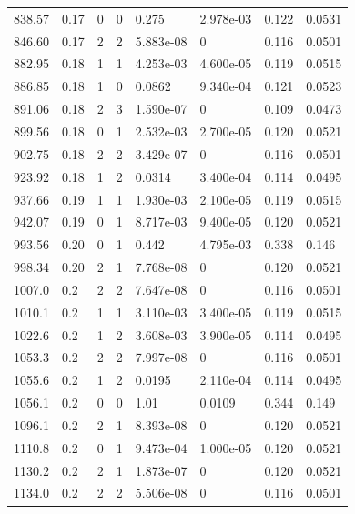 \documentclass[preview]{standalone}
\begin{document}
{{{\begin{tabular}{L{1.2cm}C{1.2cm} C{0.3cm}C{0.5cm} C{1.4cm}C{1.4cm} C{1.4cm}C{1.4cm}}
  838.57  &  0.17  & 0     &  0 &  0.275  & 2.978e-03  & 0.122 &  0.0531   \\ 
  846.60  &  0.17  & 2     &  2 &  5.883e-08  & 0  & 0.116 &  0.0501   \\ 
  882.95  &  0.18  & 1     &  1 &  4.253e-03  & 4.600e-05  & 0.119 &  0.0515   \\ 
  886.85  &  0.18  & 1     &  0 &  0.0862  & 9.340e-04  & 0.121 &  0.0523   \\ 
  891.06  &  0.18  & 2     &  3 &  1.590e-07  & 0  & 0.109 &  0.0473   \\ 
  899.56  &  0.18  & 0     &  1 &  2.532e-03  & 2.700e-05  & 0.120 &  0.0521   \\ 
  902.75  &  0.18  & 2     &  2 &  3.429e-07  & 0  & 0.116 &  0.0501   \\ 
  923.92  &  0.18  & 1     &  2 &  0.0314  & 3.400e-04  & 0.114 &  0.0495   \\ 
  937.66  &  0.19  & 1     &  1 &  1.930e-03  & 2.100e-05  & 0.119 &  0.0515   \\ 
  942.07  &  0.19  & 0     &  1 &  8.717e-03  & 9.400e-05  & 0.120 &  0.0521   \\ 
  993.56  &  0.20  & 0     &  1 &  0.442  & 4.795e-03  & 0.338 &  0.146   \\ 
  998.34  &  0.20  & 2     &  1 &  7.768e-08  & 0  & 0.120 &  0.0521   \\ 
  1007.0  &   0.2  & 2     &  2 &  7.647e-08  & 0  & 0.116 &  0.0501   \\ 
  1010.1  &   0.2  & 1     &  1 &  3.110e-03  & 3.400e-05  & 0.119 &  0.0515   \\ 
  1022.6  &   0.2  & 1     &  2 &  3.608e-03  & 3.900e-05  & 0.114 &  0.0495   \\ 
  1053.3  &   0.2  & 2     &  2 &  7.997e-08  & 0  & 0.116 &  0.0501   \\ 
  1055.6  &   0.2  & 1     &  2 &  0.0195  & 2.110e-04  & 0.114 &  0.0495   \\ 
  1056.1  &   0.2  & 0     &  0 &  1.01  & 0.0109  & 0.344 &  0.149   \\ 
  1096.1  &   0.2  & 2     &  1 &  8.393e-08  & 0  & 0.120 &  0.0521   \\ 
  1110.8  &   0.2  & 0     &  1 &  9.473e-04  & 1.000e-05  & 0.120 &  0.0521   \\ 
  1130.2  &   0.2  & 2     &  1 &  1.873e-07  & 0  & 0.120 &  0.0521   \\ 
  1134.0  &   0.2  & 2     &  2 &  5.506e-08  & 0  & 0.116 &  0.0501   \\ 

\end{tabular}}}}
\end{document}
